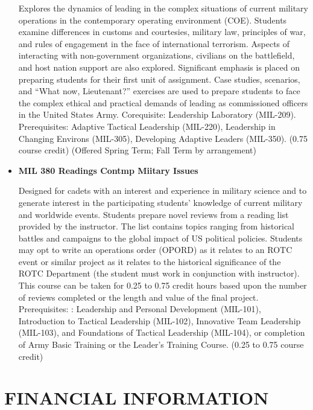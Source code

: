\documentclass[
  letterpaper,
]{scrbook}
\renewcommand{\part}[1]{\addcontentsline{toc}{part}{#1}}
\begin{document}
\begin{itemize}
  Explores the dynamics of leading in the complex situations of current
  military operations in the contemporary operating environment (COE).
  Students examine differences in customs and courtesies, military law,
  principles of war, and rules of engagement in the face of
  international terrorism. Aspects of interacting with non-government
  organizations, civilians on the battlefield, and host nation support
  are also explored. Significant emphasis is placed on preparing
  students for their first unit of assignment. Case studies, scenarios,
  and ``What now, Lieutenant?'' exercises are used to prepare students
  to face the complex ethical and practical demands of leading as
  commissioned officers in the United States Army. Corequisite:
  Leadership Laboratory (MIL-209). Prerequisites: Adaptive Tactical
  Leadership (MIL-220), Leadership in Changing Environs (MIL-305),
  Developing Adaptive Leaders (MIL-350). (0.75 course credit) (Offered
  Spring Term; Fall Term by arrangement)
\item
  \textbf{MIL 380 Readings Contmp Miitary Issues}

  Designed for cadets with an interest and experience in military
  science and to generate interest in the participating students'
  knowledge of current military and worldwide events. Students prepare
  novel reviews from a reading list provided by the instructor. The list
  contains topics ranging from historical battles and campaigns to the
  global impact of US political policies. Students may opt to write an
  operations order (OPORD) as it relates to an ROTC event or similar
  project as it relates to the historical significance of the ROTC
  Department (the student must work in conjunction with instructor).
  This course can be taken for 0.25 to 0.75 credit hours based upon the
  number of reviews completed or the length and value of the final
  project. Prerequisites: : Leadership and Personal Development
  (MIL-101), Introduction to Tactical Leadership (MIL-102), Innovative
  Team Leadership (MIL-103), and Foundations of Tactical Leadership
  (MIL-104), or completion of Army Basic Training or the Leader's
  Training Course. (0.25 to 0.75 course credit)
\end{itemize}

\part{FINANCIAL RESOURCES}

\hypertarget{financial-information}{%
\chapter{FINANCIAL INFORMATION}\label{financial-information}}
\end{document}
